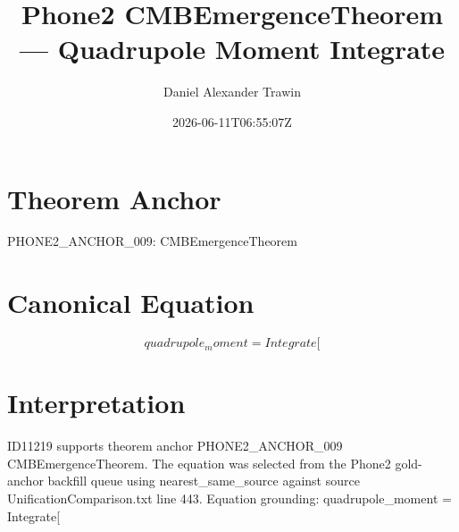 \documentclass[11pt]{article}
\title{Phone2 CMBEmergenceTheorem — Quadrupole Moment Integrate}
\author{Daniel Alexander Trawin}
\date{2026-06-11T06:55:07Z}
\begin{document}
\maketitle
\section*{Theorem Anchor}
PHONE2_ANCHOR_009: CMBEmergenceTheorem
\section*{Canonical Equation}
\[
quadrupole_moment = Integrate[
\]
\section*{Interpretation}
ID11219 supports theorem anchor PHONE2_ANCHOR_009 CMBEmergenceTheorem. The equation was selected from the Phone2 gold-anchor backfill queue using nearest_same_source against source UnificationComparison.txt line 443. Equation grounding: quadrupole_moment = Integrate[
\end{document}
